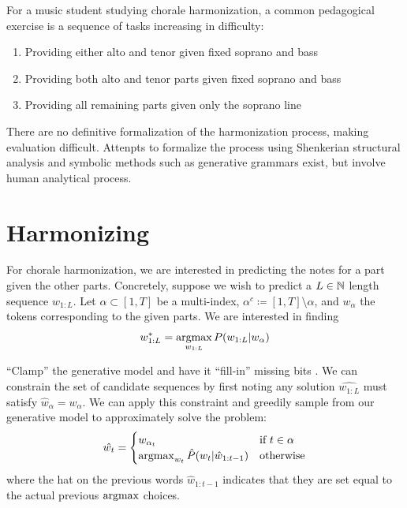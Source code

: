 For a music student studying chorale harmonization, a common pedagogical
exercise \citep{denny1960oxford}\citep{piston1978harmony} is a sequence of tasks increasing in difficulty:
\begin{enumerate}
  \item Providing either alto and tenor given fixed soprano and bass
  \item Providing both alto and tenor parts given fixed soprano and bass
  \item Providing all remaining parts given only the soprano line
\end{enumerate}

There are no definitive formalization of the harmonization process, making
evaluation difficult. Attenpts to formalize the process using Shenkerian
structural analysis \citep{schenker1954harmony} and symbolic methods such as
generative grammars \citep{lerdahl1983jackendoff}\citep{winograd1968linguistics}
exist, but involve human analytical process.

\section{Harmonizing}


For chorale harmonization, we are interested in predicting the notes for a part
given the other parts. Concretely, suppose we wish to predict a $L \in \mathbb{N}$
length sequence $w_{1:L}$. Let $\alpha \subset [1,T]$ be a multi-index,
$\alpha^c \coloneqq [1,T] \setminus \alpha$, and $w_\alpha$ the tokens
corresponding to the given parts. We are interested in finding
\begin{equation}
  w_{1:L}^* = \operatorname*{argmax}_{w_{1:L}} P(w_{1:L} | w_{\alpha})
\end{equation}


``Clamp'' the generative model and have it ``fill-in'' missing bits
\citep{hinton1986learning}. We can constrain the set of candidate sequences by
first noting any solution $\hat{w_{1:L}}$ must satisfy $\hat{w}_\alpha =
w_\alpha$. We can apply this constraint and greedily sample from our generative
model to approximately solve the problem:
\begin{equation}
  \hat{w_{t}} = \begin{cases}
    w_{\alpha_t} &\text{if}~t \in \alpha \\
    \operatorname*{argmax}_{w_t} \hat{P}(w_t | \hat{w}_{1:t-1}) &\text{otherwise}
  \end{cases}
\end{equation}
where the hat on the previous words $\hat{w}_{1:t-1}$ indicates that they are
set equal to the actual previous $\operatorname*{argmax}$ choices.

